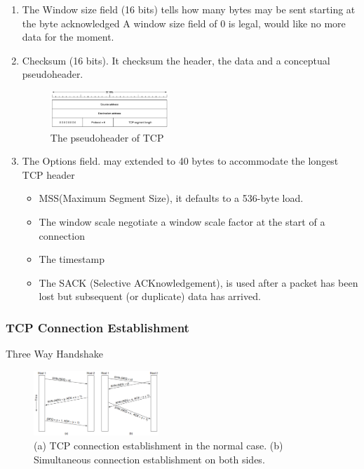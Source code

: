 \begin{enumerate}
    \item The Window size field (16 bits) tells how many bytes
    may be sent starting at the byte acknowledged
    \subitem A window size field of 0 is legal, would like no more data for the moment. 
    \item Checksum (16 bits).  It checksum the header, the data and a conceptual pseudoheader. 
    \begin{figure}[!htb]
        \centering
        \includegraphics[width=0.42\textwidth]{pic/CN6/The pseudoheader of TCP}
        \caption{The pseudoheader of TCP}
    \end{figure}
    \item The Options field. may extended to 40 bytes to accommodate the longest TCP header 
    \begin{itemize}
        \item MSS(Maximum Segment Size), it defaults to a 536-byte load.
        \item The window scale negotiate a window scale factor at the start of a connection
        \item The timestamp 
        \item The SACK (Selective ACKnowledgement), is  used after a packet has been lost but subsequent (or duplicate) data has arrived. 
    \end{itemize}
\end{enumerate}

\subsubsection{TCP Connection Establishment}
Three Way Handshake
\begin{figure}[!htb]
    \centering
    \includegraphics[width=0.42\textwidth]{pic/CN6/TCP Connection Establishment}
    \caption{(a) TCP connection establishment in the normal case. (b) Simultaneous connection establishment on both sides.}
\end{figure}

